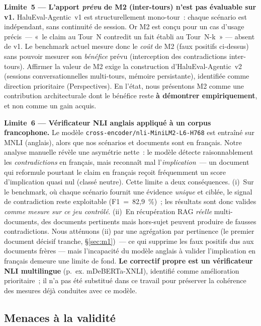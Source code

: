 \documentclass[12pt,a4paper]{article}
\begin{document}
\textbf{Limite~5 --- L'apport \emph{prévu} de M2 (inter-tours) n'est pas évaluable sur v1.}
HaluEval-Agentic~v1 est structurellement mono-tour~: chaque scénario est indépendant, sans continuité de session. Or M2 est conçu pour un cas d'usage précis~--- «~le claim au Tour~N contredit un fait établi au Tour~N-k~» --- absent de v1. Le benchmark actuel mesure donc le \emph{coût} de M2 (faux positifs ci-dessus) sans pouvoir mesurer son \emph{bénéfice} prévu (interception des contradictions inter-tours). Affirmer la valeur de M2 exige la construction d'HaluEval-Agentic~v2 (sessions conversationnelles multi-tours, mémoire persistante), identifiée comme direction prioritaire (Perspectives). En l'état, nous présentons M2 comme une contribution architecturale dont le bénéfice reste \textbf{à démontrer empiriquement}, et non comme un gain acquis.

\textbf{Limite~6 --- Vérificateur NLI anglais appliqué à un corpus francophone.}
Le modèle \texttt{cross-encoder/nli-MiniLM2-L6-H768} est entraîné sur MNLI (anglais), alors que nos scénarios et documents sont en français. Notre analyse manuelle révèle une asymétrie nette~: le modèle détecte raisonnablement les \emph{contradictions} en français, mais reconnaît mal l'\emph{implication}~--- un document qui reformule pourtant le claim en français reçoit fréquemment un score d'implication quasi nul (classé \og{}neutre\fg{}). Cette limite a deux conséquences. (i)~Sur le benchmark, où chaque scénario fournit une évidence \emph{unique} et ciblée, le signal de contradiction reste exploitable (F1~=~82,9~\%)~; les résultats sont donc valides \emph{comme mesure sur ce jeu contrôlé}. (ii)~En récupération RAG \emph{réelle} multi-documents, des documents pertinents mais hors-sujet peuvent produire de fausses contradictions. Nous atténuons (ii) par une agrégation par pertinence (le premier document décisif tranche, §\ref{sec:m1})~--- ce qui supprime les faux positifs dus aux documents frères --- mais l'incapacité du modèle anglais à valider l'implication en français demeure une limite de fond. \textbf{Le correctif propre est un vérificateur NLI multilingue} (p.~ex. mDeBERTa-XNLI), identifié comme amélioration prioritaire~; il n'a pas été substitué dans ce travail pour préserver la cohérence des mesures déjà conduites avec ce modèle.

\subsection{Menaces à la validité}
\label{sec:threats}
\end{document}
